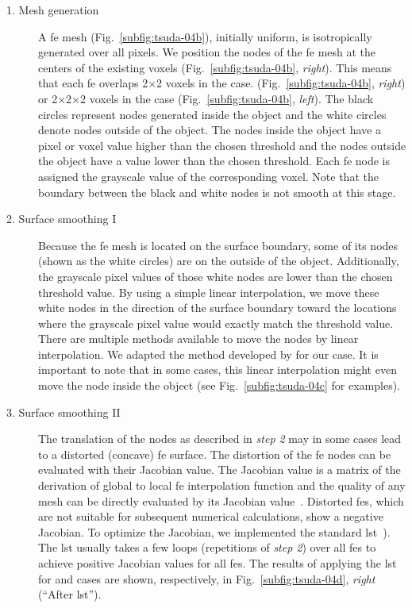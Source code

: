 \begin{description}
	\item[1. Mesh generation] A \ac{fe} mesh (Fig.~\ref{subfig:tsuda-04b}), initially uniform, is isotropically generated over all pixels. We position the nodes of the \ac{fe} mesh at the centers of the existing voxels (Fig.~\ref{subfig:tsuda-04b}, \textit{right}). This means that each \ac{fe} overlaps 2$\times$2 voxels in the \twod case. (Fig.~\ref{subfig:tsuda-04b}, \textit{right}) or 2$\times$2$\times$2 voxels in the \threed case (Fig.~\ref{subfig:tsuda-04b}, \textit{left}). The black circles represent nodes generated inside the object and the white circles denote nodes outside of the object. The nodes inside the object have a pixel or voxel value higher than the chosen threshold and the nodes outside the object have a value lower than the chosen threshold. Each \ac{fe} node is assigned the grayscale value of the corresponding voxel. Note that the boundary between the black and white nodes is not smooth at this stage.
	\item[2. Surface smoothing I] Because the \ac{fe} mesh is located on the surface boundary, some of its nodes (shown as the white circles) are on the outside of the object. Additionally, the grayscale pixel values of those white nodes are lower than the chosen threshold value. By using a simple linear interpolation, we move these white nodes in the direction of the surface boundary toward the locations where the grayscale pixel value would exactly match the threshold value. There are multiple methods available to move the nodes by linear interpolation. We adapted the method developed by \citet{Schneiders1996} for our \threed case. It is important to note that in some cases, this linear interpolation might even move the node inside the object (see Fig.~\ref{subfig:tsuda-04c} for examples).
	\item[3. Surface smoothing II] The translation of the nodes as described in \textit{step 2} may in some cases lead to a distorted (concave) \ac{fe} surface. The distortion of the \ac{fe} nodes can be evaluated with their Jacobian value. The Jacobian value is a matrix of the derivation of global to local \ac{fe} interpolation function and the quality of any mesh can be directly evaluated by its Jacobian value~\cite{Bathe1995}. Distorted \acp{fe}, which are not suitable for subsequent numerical calculations, show a negative Jacobian. To optimize the Jacobian, we implemented the standard \ac{lst}~\cite{Freitag2000}). The \ac{lst} usually takes a few loops (repetitions of \textit{step 2}) over all \acp{fe} to achieve positive Jacobian values for all \acp{fe}. The results of applying the \ac{lst} for \threed and \twod cases are shown, respectively, in Fig.~\ref{subfig:tsuda-04d}, \textit{right} (``After \ac{lst}'').
\end{description}

